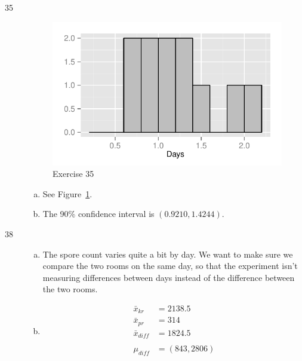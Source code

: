 \documentclass[letterpaper]{exam}
\begin{document}
\begin{description}
      \item[35]
        \begin{figure}[H]
          \centering
          \includegraphics[scale = 1.0]{figures/ex35.pdf}
          \caption{Exercise 35}\label{fig:ex35}
        \end{figure}

        \begin{enumerate}[(a)]
          \item See Figure~\ref{fig:ex35}. 
          \item The 90\% confidence interval is $(0.9210, 1.4244)$.
        \end{enumerate}

      \item[38]
        \begin{enumerate}[(a)]
          \item The spore count varies quite a bit by day. We want to make sure
            we compare the two rooms on the same day, so that the experiment
            isn't measuring differences between days instead of the difference
            between the two rooms.

          \item 
            \begin{align*}
              \bar{x}_{kr}   & = 2138.5 \\
              \bar{x}_{pr}   & = 314 \\
              \bar{x}_{diff} & = 1824.5 \\
              \\
              \mu_{diff} &= (843, 2806) \\
            \end{align*}


\end{enumerate}
\end{description}
\end{document}
